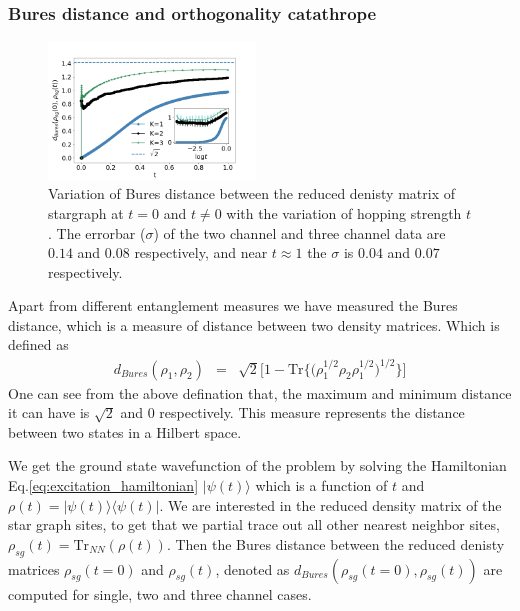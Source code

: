 \documentclass[reprint,prb,superscriptaddress]{revtex4-2}
\begin{document}
\subsubsection{Bures distance and orthogonality catathrope}
\begin{figure}[!htpb]
\includegraphics[width=0.49\textwidth]{plt/error_Bures_Distance_Ch123_10001}
\caption{Variation of Bures distance between the reduced denisty matrix of stargraph at $t=0$ and $t\neq 0$ with the variation of hopping  strength $t$. The errorbar ($\sigma$) of the two channel and three channel data are $0.14$ and $0.08$ respectively, and near $t\approx 1$ the $\sigma$ is $0.04$ and $0.07$ respectively.}
\label{fig:bures_distance}
\end{figure}
\noindent Apart from different entanglement measures we have measured the Bures distance, which is a measure of distance between two density matrices. Which is defined as 
\begin{eqnarray}
d_{Bures}(\rho_1,\rho_2) &=& \sqrt{2} \bigg[1- \textrm{Tr}\bigg\{ \bigg(\rho_1^{1/2}  \rho_2 \rho_{1}^{1/2}\bigg)^{1/2} \bigg\}\bigg]
\end{eqnarray}
One can see from the above defination that, the maximum and minimum distance it can have is $\sqrt{2}$ and $0$ respectively. This measure represents the distance between two states in a Hilbert space. 
\par We get the ground state wavefunction of the problem by solving the Hamiltonian Eq.\eqref{eq:excitation_hamiltonian} $|\psi(t)\rangle$ which is a function of $t$ and $\rho(t)= |\psi(t)\rangle \langle \psi(t)|$. We are interested in the reduced density matrix of the star graph sites, to get that we partial trace out all other nearest neighbor sites, $\rho_{sg}(t)=\textrm{Tr}_{NN}(\rho(t))$. Then the Bures distance between the reduced denisty matrices $\rho_{sg}(t=0)$ and $\rho_{sg}(t)$, denoted as $d_{Bures}(\rho_{sg}(t=0),\rho_{sg}(t))$ are computed for single, two and three channel cases.
\end{document}
